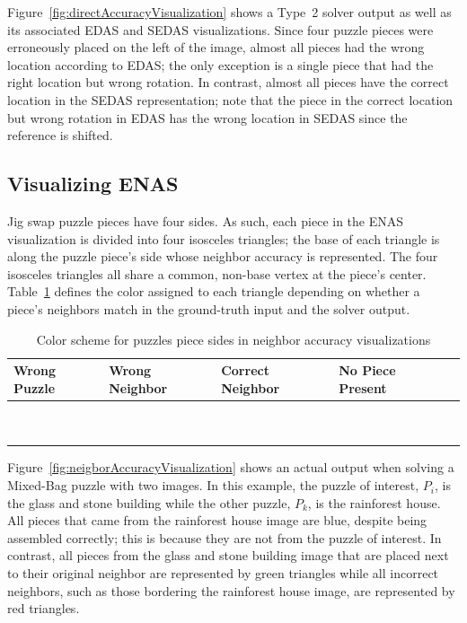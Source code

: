 Figure~\ref{fig:directAccuracyVisualization} shows a Type~2 solver output as well as its associated EDAS and SEDAS visualizations. Since four puzzle pieces were erroneously placed on the left of the image, almost all pieces had the wrong location according to EDAS; the only exception is a single piece that had the right location but wrong rotation.  In contrast, almost all pieces have the correct location in the SEDAS representation; note that the piece in the correct location but wrong rotation in EDAS has the wrong location in SEDAS since the reference is shifted.

\subsection{Visualizing ENAS}\label{sec:visualizingNeighborAccuracy}

Jig swap puzzle pieces have four sides.  As such, each piece in the ENAS visualization is divided into four isosceles triangles; the base of each triangle is along the puzzle piece's side whose neighbor accuracy is represented.  The four isosceles triangles all share a common, non-base vertex at the piece's center.  Table~\ref{tab:neighborAccuracyColors} defines the color assigned to each triangle depending on whether a piece's neighbors match in the ground-truth input and the solver output.  

\begin{table}[t!]
\begin{center}
  \caption{Color scheme for puzzles piece sides in neighbor accuracy visualizations}\label{tab:neighborAccuracyColors}
  \begin{tabular}{ | >{\centering\arraybackslash}m{0.9in} | >{\centering\arraybackslash}m{0.9in} | >{\centering\arraybackslash}m{0.9in} | >{\centering\arraybackslash}m{0.9in} | >{\centering\arraybackslash}m{0.9in} | }
 \hline
    Wrong Puzzle & Wrong Neighbor & Correct Neighbor  & No Piece Present  \\ \hline
	{\cellcolor{blue}~} & {\cellcolor{red}~} & {\cellcolor{green}~} & {\cellcolor{black}~}  \\
	{\cellcolor{blue}~} & {\cellcolor{red}~} & {\cellcolor{green}~} & {\cellcolor{black}~}  \\
 \hline
  \end{tabular}
\end{center}
\end{table}

Figure~\ref{fig:neigborAccuracyVisualization} shows an actual output when solving a Mixed-Bag puzzle with two images.  In this example, the puzzle of interest, $P_i$, is the glass and stone building while the other puzzle, $P_k$, is the rainforest house.  All pieces that came from the rainforest house image are blue, despite being assembled correctly; this is because they are not from the puzzle of interest.  In contrast, all pieces from the glass and stone building image that are placed next to their original neighbor are represented by green triangles while all incorrect neighbors, such as those bordering the rainforest house image, are represented by red triangles.

